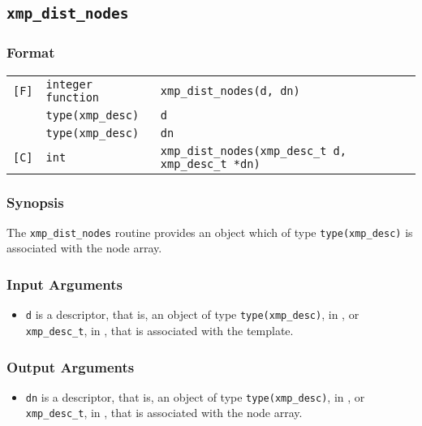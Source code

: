 \subsection{\tt xmp\_dist\_nodes}

\subsubsection*{Format}

\begin{tabular}{lll}

\verb![F]!& {\tt integer function}& {\tt xmp\_dist\_nodes(d, dn)}\\
          & {\tt type(xmp\_desc)} & {\tt d}\\
          & {\tt type(xmp\_desc)} & {\tt dn}\\

\verb![C]!&  {\tt int}& {\tt xmp\_dist\_nodes(xmp\_desc\_t d, xmp\_desc\_t *dn)}\\

\end{tabular}

\subsubsection*{Synopsis}

The {\tt xmp\_dist\_nodes} routine provides an object which of type {\tt type(xmp\_desc)} is associated with the node array.


\subsubsection*{Input Arguments}
\begin{itemize}
 \item {\tt d} is a descriptor, that is, an object of type 
       {\tt type(xmp\_desc)}, in {\XMPF}, or {\tt xmp\_desc\_t},
       in {\XMPC}, that is associated with the template.
\end{itemize}

\subsubsection*{Output Arguments}
\begin{itemize}
 \item {\tt dn} is a descriptor, that is, an object of type 
       {\tt type(xmp\_desc)}, in {\XMPF}, or {\tt xmp\_desc\_t},
       in {\XMPC}, that is associated with the node array.
\end{itemize}


